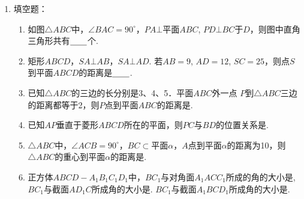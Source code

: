 \begin{enumerate}
    \item 填空题：
\begin{enumerate}[(1)]
    \item 如图$\triangle ABC$中，$\angle BAC=90^{\circ}$，$PA\bot $平面$ABC$, $PD\bot BC$于$D$，则图中直角三角形共有$\underline{\qquad}$个.
    \item 矩形$ABCD$，$SA\bot AB$，$SA\bot AD$. 若$AB=9$, $AD
    =12$, $SC=25$，则点$S$到平面$ABCD$的距离是$\underline{\qquad}$.
   \item  已知$\triangle ABC$的三边的长分别是3、4、5．平面$ABC$外一点
   $P$到$\triangle ABC$三边的距离都等于2，则$P$点到平面$ABC$的距离是\blank.
\item 已知$AP$垂直于菱形$ABCD$所在的平面，则$PC$与$BD$的位置关系是\blank.
   \item $\triangle ABC$中，$\angle ACB=90^{\circ}$，$BC\subset$平面$\alpha$，$A$点到平面$\alpha$的距离为10，则$\triangle ABC$的重心到平面$\alpha$的距离是\blank.
   \item 正方体$ABCD-A_1B_1C_1D_1$中，$BC_1$与对角面$A_1ACC_1$所成的角的大小是\blank, $BC_1$与截面$AD_1C$所成角的大小是\blank. $BC_1$与截面$A_1BCD_1$所成角的大小是\blank.
\end{enumerate}

\noindent
\begin{minipage}{.45\textwidth}\centering
{}
\end{minipage}
\hfill
\begin{minipage}{.45\textwidth}
\centering
{}
\end{minipage}



\end{enumerate}
